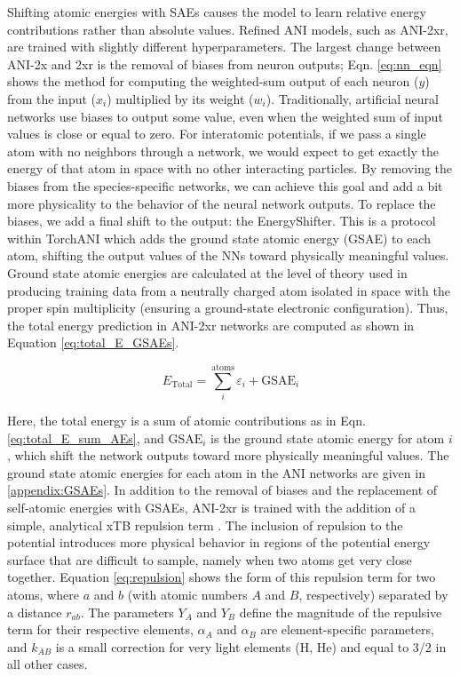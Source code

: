 Shifting atomic energies with SAEs causes the model to learn relative energy contributions rather than absolute values. 
Refined ANI models, such as ANI-2xr, are trained with slightly different hyperparameters.
The largest change between ANI-2x and 2xr is the removal of biases from neuron outputs; Eqn. \ref{eq:nn_eqn} shows the method for computing the weighted-sum output of each neuron ($y$) from the input ($x_i$) multiplied by its weight ($w_i$).
Traditionally, artificial neural networks use biases to output some value, even when the weighted sum of input values is close or equal to zero.
For interatomic potentials, if we pass a single atom with no neighbors through a network, we would expect to get exactly the energy of that atom in space with no other interacting particles.
By removing the biases from the species-specific networks, we can achieve this goal and add a bit more physicality to the behavior of the neural network outputs.
To replace the biases, we add a final shift to the output: the EnergyShifter.
This is a protocol within TorchANI which adds the ground state atomic energy (GSAE) to each atom, shifting the output values of the NNs toward physically meaningful values.
Ground state atomic energies are calculated at the level of theory used in producing training data from a neutrally charged atom isolated in space with the proper spin multiplicity (ensuring a ground-state electronic configuration).
Thus, the total energy prediction in ANI-2xr networks are computed as shown in Equation \ref{eq:total_E_GSAEs}.

\begin{equation}
    E_{\text{Total}} = \sum_{i}^{\text{atoms}} \varepsilon_i + \text{GSAE}_i
    \label{eq:total_E_GSAEs}
\end{equation}

Here, the total energy is a sum of atomic contributions as in Eqn. \ref{eq:total_E_sum_AEs}, and $\text{GSAE}_i$ is the ground state atomic energy for atom $i$, which shift the network outputs toward more physically meaningful values.
The ground state atomic energies for each atom in the ANI networks are given in \ref{appendix:GSAEs}.
In addition to the removal of biases and the replacement of self-atomic energies with GSAEs, ANI-2xr is trained with the addition of a simple, analytical xTB repulsion term \cite{xtb_repulsion}.
The inclusion of repulsion to the potential introduces more physical behavior in regions of the potential energy surface that are difficult to sample, namely when two atoms get very close together.
Equation \ref{eq:repulsion} shows the form of this repulsion term for two atoms, where $a$ and $b$ (with atomic numbers $A$ and $B$, respectively) separated by a distance $r_{ab}$. 
The parameters $Y_A$ and $Y_B$ define the magnitude of the repulsive term for their respective elements, $\alpha_{A}$ and $\alpha_{B}$ are element-specific parameters, and $k_{AB}$ is a small correction for very light elements (H, He) and equal to 3/2 in all other cases.

